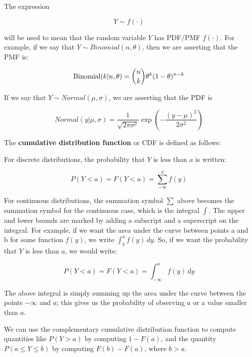 \documentclass[
  12pt,
]{krantz}
\theoremstyle{definition}
\theoremstyle{definition}
\theoremstyle{definition}
\theoremstyle{definition}
\theoremstyle{remark}
\begin{document}
\begin{blackbox}
The expression

\begin{equation}
 Y \sim f(\cdot)
\end{equation}

\noindent
will be used to mean that the random variable \(Y\) has PDF/PMF \(f(\cdot)\).
For example, if we say that \(Y \sim Binomial(n,\theta)\), then we are asserting that the PMF is:

\begin{equation}
\hbox{Binomial}(k|n,\theta) = 
\binom{n}{k} \theta^{k} (1-\theta)^{n-k}
\end{equation}

If we say that \(Y\sim Normal(\mu,\sigma)\), we are asserting that the PDF is

\begin{equation}
Normal(y|\mu,\sigma)= \frac{1}{\sqrt{2\pi \sigma^2}} \exp \left(-\frac{(y-\mu)^2}{2\sigma^2} \right)
\end{equation}

The \textbf{cumulative distribution function} or CDF is defined as follows:

For discrete distributions, the probability that \(Y\) is less than \(a\) is written:

\begin{equation}
P(Y<a) = F(Y<a) =\sum_{-\infty}^{a} f(y)
\end{equation}

For continuous distributions, the summation symbol \(\sum\) above becomes the summation symbol for the continuous case, which is the integral \(\int\). The upper and lower bounds are marked by adding a subscript and a superscript on the integral. For example, if we want the area under the curve between points a and b for some function \(f(y)\), we write \(\int_b^a f(y)\, dy\). So, if we want the probability that \(Y\) is less than \(a\), we would write:

\begin{equation}
P(Y<a) = F(Y<a) =\int_{-\infty}^{a} f(y)\, dy
\end{equation}

The above integral is simply summing up the area under the curve between the points \(-\infty\) and \(a\); this gives us the probability of observing \(a\) or a value smaller than \(a\).

We can use the complementary cumulative distribution function to compute quantities like \(P(Y>a)\) by computing \(1-F(a)\), and the quantity \(P(a\leq Y\leq b)\) by computing \(F(b)-F(a)\), where \(b>a\).


\end{blackbox}
\end{document}
